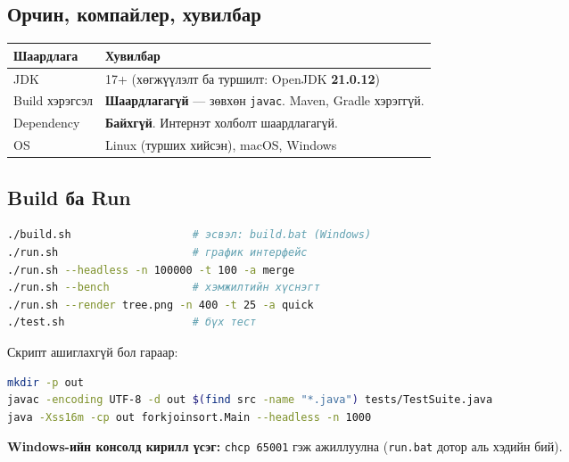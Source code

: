 \documentclass[11pt,a4paper]{article}
\begin{document}
\subsection{Орчин, компайлер, хувилбар}
\begin{center}
\small
\begin{tabular}{lL{9.5cm}}
\toprule
Шаардлага & Хувилбар \\
\midrule
JDK & 17+ (хөгжүүлэлт ба туршилт: OpenJDK \textbf{21.0.12}) \\
Build хэрэгсэл & \textbf{Шаардлагагүй} --- зөвхөн \texttt{javac}. Maven, Gradle хэрэггүй. \\
Dependency & \textbf{Байхгүй}. Интернэт холболт шаардлагагүй. \\
OS & Linux (турших хийсэн), macOS, Windows \\
\bottomrule
\end{tabular}
\end{center}

\subsection{Build ба Run}
\begin{lstlisting}[language=bash]
./build.sh                   # эсвэл: build.bat (Windows)
./run.sh                     # график интерфейс
./run.sh --headless -n 100000 -t 100 -a merge
./run.sh --bench             # хэмжилтийн хүснэгт
./run.sh --render tree.png -n 400 -t 25 -a quick
./test.sh                    # бүх тест
\end{lstlisting}

Скрипт ашиглахгүй бол гараар:
\begin{lstlisting}[language=bash]
mkdir -p out
javac -encoding UTF-8 -d out $(find src -name "*.java") tests/TestSuite.java
java -Xss16m -cp out forkjoinsort.Main --headless -n 1000
\end{lstlisting}

\textbf{Windows-ийн консолд кирилл үсэг:} \texttt{chcp 65001} гэж ажиллуулна
(\texttt{run.bat} дотор аль хэдийн бий).
\end{document}
